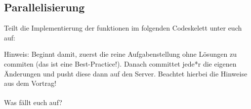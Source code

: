 \subsection{Parallelisierung}
Teilt die Implementierung der funktionen im folgenden Codeskelett unter euch auf:

Hinweis: Beginnt damit, zuerst die reine Aufgabenstellung ohne Lösungen zu commiten (das ist eine Best-Practice!).
Danach committet jede*r die eigenen Änderungen und pusht diese dann auf den Server.
Beachtet hierbei die Hinweise aus dem Vortrag!\\\\
Was fällt euch auf?
